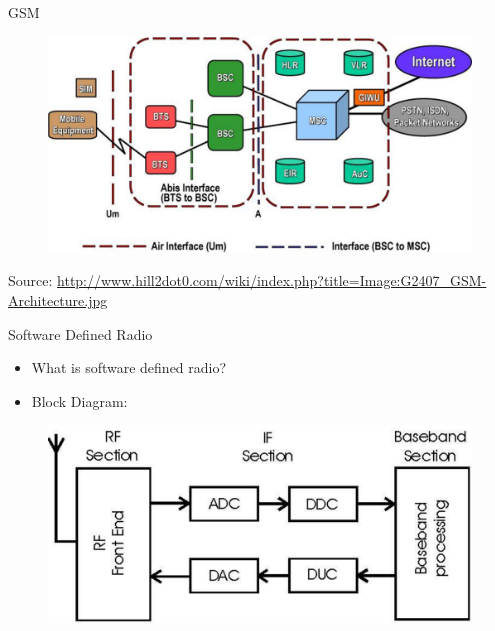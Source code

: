 \documentclass{beamer}
\begin{document}
   \begin{frame}{GSM}
    \begin{minipage}[t][0.8\textheight][t]{\textwidth}
      \begin{figure}
        \centering
        \includegraphics[width=0.8\linewidth]{img/gsmArch}
      \end{figure}
      \vfill
      \tiny{Source: \url{http://www.hill2dot0.com/wiki/index.php?title=Image:G2407\_GSM-Architecture.jpg}}
    \end{minipage}
  \end{frame}
 
  \begin{frame}{Software Defined Radio}
    \begin{itemize}
      \item What is software defined radio?
      \item Block Diagram:
    \end{itemize}
    \begin{figure}
      \centering
      \includegraphics[width=\linewidth]{img/sdrBlock}
    \end{figure}
  \end{frame}
\end{document}
